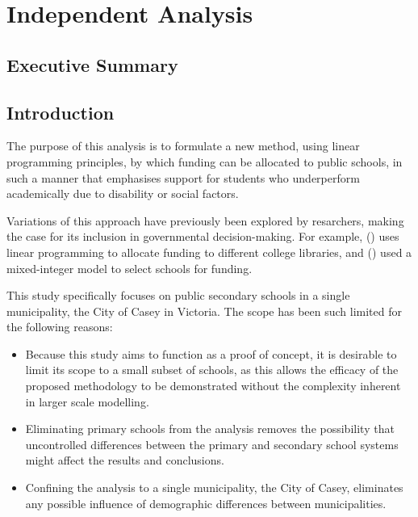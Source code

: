 \documentclass[11pt, a4paper]{article}
\begin{document}
    \newpage

    \section{Independent Analysis}

    \subsection{Executive Summary}

    

    \subsection{Introduction} \label{intro}

    The purpose of this analysis is to formulate a new method, using linear programming principles, by which funding can be allocated to public schools, in such a manner that emphasises support for students who underperform academically due to disability or social factors.

    Variations of this approach have previously been explored by resarchers, making the case for its inclusion in governmental decision-making. For example,  () uses linear programming to allocate funding to different college libraries, and  () used a mixed-integer model to select schools for funding. 
    
    This study specifically focuses on public secondary schools in a single municipality, the City of Casey in Victoria. The scope has been such limited for the following reasons:

    \begin{itemize}
        \item Because this study aims to function as a proof of concept, it is desirable to limit its scope to a small subset of schools, as this allows the efficacy of the proposed methodology to be demonstrated without the complexity inherent in larger scale modelling.
        \item Eliminating primary schools from the analysis removes the possibility that uncontrolled differences between the primary and secondary school systems might affect the results and conclusions.
        \item Confining the analysis to a single municipality, the City of Casey, eliminates any possible influence of demographic differences between municipalities.  
    \end{itemize}
\end{document}
